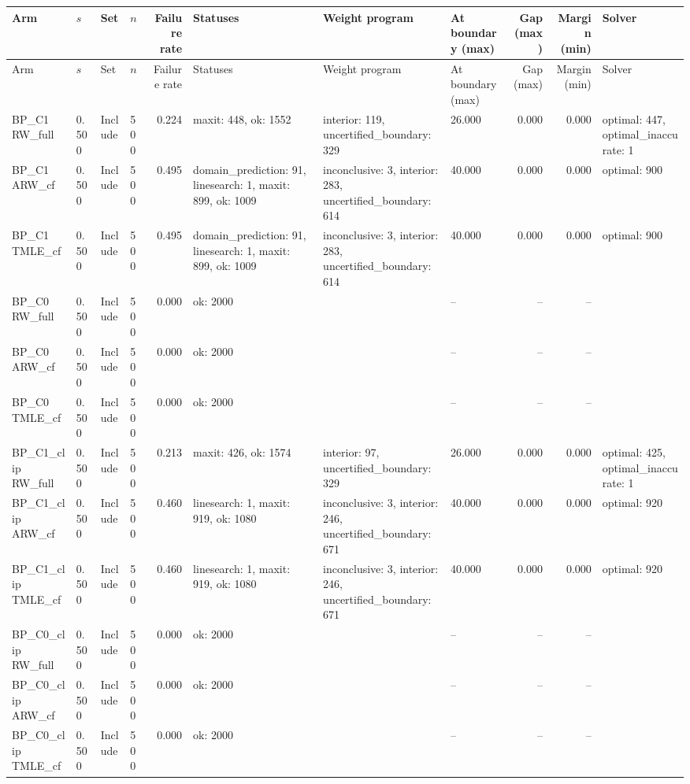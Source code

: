 \begin{tabular}{llllrlllrrl}
\hline
Arm & $s$ & Set & $n$ & Failure rate & Statuses & Weight program & At boundary (max) & Gap (max) & Margin (min) & Solver \\
\hline
\endfirsthead
\hline
Arm & $s$ & Set & $n$ & Failure rate & Statuses & Weight program & At boundary (max) & Gap (max) & Margin (min) & Solver \\
\hline
\endhead
BP\_C1 RW\_full & 0.500 & Include & 500 & 0.224 & maxit: 448, ok: 1552 & interior: 119, uncertified\_boundary: 329 & 26.000 & 0.000 & 0.000 & optimal: 447, optimal\_inaccurate: 1 \\
BP\_C1 ARW\_cf & 0.500 & Include & 500 & 0.495 & domain\_prediction: 91, linesearch: 1, maxit: 899, ok: 1009 & inconclusive: 3, interior: 283, uncertified\_boundary: 614 & 40.000 & 0.000 & 0.000 & optimal: 900 \\
BP\_C1 TMLE\_cf & 0.500 & Include & 500 & 0.495 & domain\_prediction: 91, linesearch: 1, maxit: 899, ok: 1009 & inconclusive: 3, interior: 283, uncertified\_boundary: 614 & 40.000 & 0.000 & 0.000 & optimal: 900 \\
BP\_C0 RW\_full & 0.500 & Include & 500 & 0.000 & ok: 2000 &  & -- & -- & -- &  \\
BP\_C0 ARW\_cf & 0.500 & Include & 500 & 0.000 & ok: 2000 &  & -- & -- & -- &  \\
BP\_C0 TMLE\_cf & 0.500 & Include & 500 & 0.000 & ok: 2000 &  & -- & -- & -- &  \\
BP\_C1\_clip RW\_full & 0.500 & Include & 500 & 0.213 & maxit: 426, ok: 1574 & interior: 97, uncertified\_boundary: 329 & 26.000 & 0.000 & 0.000 & optimal: 425, optimal\_inaccurate: 1 \\
BP\_C1\_clip ARW\_cf & 0.500 & Include & 500 & 0.460 & linesearch: 1, maxit: 919, ok: 1080 & inconclusive: 3, interior: 246, uncertified\_boundary: 671 & 40.000 & 0.000 & 0.000 & optimal: 920 \\
BP\_C1\_clip TMLE\_cf & 0.500 & Include & 500 & 0.460 & linesearch: 1, maxit: 919, ok: 1080 & inconclusive: 3, interior: 246, uncertified\_boundary: 671 & 40.000 & 0.000 & 0.000 & optimal: 920 \\
BP\_C0\_clip RW\_full & 0.500 & Include & 500 & 0.000 & ok: 2000 &  & -- & -- & -- &  \\
BP\_C0\_clip ARW\_cf & 0.500 & Include & 500 & 0.000 & ok: 2000 &  & -- & -- & -- &  \\
BP\_C0\_clip TMLE\_cf & 0.500 & Include & 500 & 0.000 & ok: 2000 &  & -- & -- & -- &  \\

\end{tabular}

